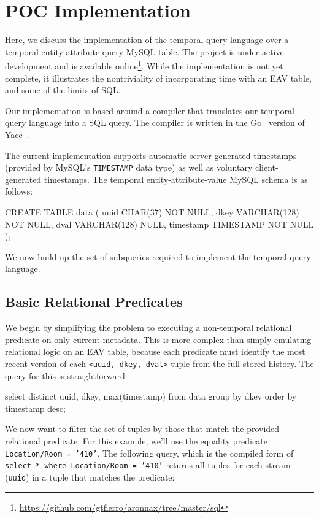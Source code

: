 \section{POC Implementation} \label{section:implementation}

Here, we discuss the implementation of the temporal query language over a
temporal entity-attribute-query MySQL table. The project is under active
development and is available
online\footnote{\url{https://github.com/gtfierro/aronnax/tree/master/sql}}.
While the implementation is not yet complete, it illustrates the nontriviality
of incorporating time with an EAV table, and some of the limits of SQL.

Our implementation is based around a compiler that translates our temporal
query language into a SQL query. The compiler is written in the Go~\cite{go} version
of Yacc~\cite{johnson1975yacc}\cite{goyacc}.

The current implementation supports automatic server-generated timestamps (provided by MySQL's \texttt{TIMESTAMP}
data type) as well as voluntary client-generated timestamps. The temporal entity-attribute-value MySQL schema is as
follows:
\begin{sqlcode}
CREATE TABLE data
(
    uuid CHAR(37) NOT NULL,
    dkey VARCHAR(128) NOT NULL,
    dval VARCHAR(128) NULL,
    timestamp TIMESTAMP NOT NULL
);
\end{sqlcode}

We now build up the set of subqueries required to implement the temporal query language.

\subsection{Basic Relational Predicates}

We begin by simplifying the problem to executing a non-temporal relational predicate on only current
metadata. This is more complex than simply emulating relational logic on an EAV table, because each
predicate must identify the most recent version of each \texttt{<uuid, dkey, dval>} tuple from the full
stored history. The query for this is straightforward:

\begin{sqlcode}
select distinct uuid, dkey, max(timestamp)
from data
group by dkey order by timestamp desc;
\end{sqlcode}

We now want to filter the set of tuples by those that match the provided relational predicate. For this
example, we'll use the equality predicate \texttt{Location/Room = '410'}. The following query, which is
the compiled form of \texttt{select * where Location/Room = '410'} returns
all tuples for each stream (\texttt{uuid}) in a tuple that matches the predicate:

